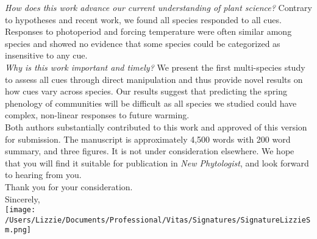 \documentclass[11pt,a4paper]{article}
\begin{document}
\emph{How does this work advance our current understanding of plant science?} Contrary to hypotheses and recent work, we found all species responded to all cues. Responses to photoperiod and forcing temperature were often similar among species and showed no evidence that some species could be categorized as insensitive to any cue. 
\vspace{1.5ex}\\
\emph{Why is this work important and timely?} We present the first multi-species study to assess all cues through direct manipulation and thus provide novel results on how cues vary across species. Our results suggest that predicting the spring phenology of communities will be difficult as all species we studied could have complex, non-linear responses to future warming.
\vspace{1.5ex}\\
Both authors substantially contributed to this work and approved of this version for submission. The manuscript is approximately 4,500 words with 200 word summary, and three figures. It is not under consideration elsewhere. We hope that you will find it suitable for publication in \emph{New Phytologist}, and look forward to hearing from you.
\vspace{1.5ex}\\
Thank you for your consideration.
\vspace{1.5ex}\\
\noindent Sincerely,\\

 \texttt{[image: /Users/Lizzie/Documents/Professional/Vitas/Signatures/SignatureLizzieSm.png]} 
\end{document}
